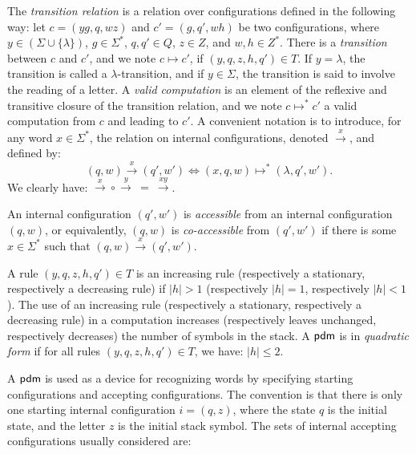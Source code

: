 The \emph{transition relation} is a relation over configurations defined in the following way: let $c = (yg, q, wz)$ and $c' = (g, q', wh)$ be two configurations, where $y \in (\Sigma \cup \{\lambda\})$, $g \in \Sigma^*$, $q, q' \in Q$, $z \in Z$, and $w, h \in Z^*$. There is a \emph{transition} between $c$ and $c'$, and we note $c \mapsto c'$, if $(y, q, z, h, q') \in T$. If $y = \lambda$, the transition is called a $\lambda$-transition, and if $y \in \Sigma$, the transition  is said to involve the reading of a letter. A \emph{valid computation} is an element of the reflexive and transitive closure of the transition relation, and we note $c \mapsto^* c'$ a valid computation from $c$ and leading to $c'$. A convenient notation is to introduce, for any word $x \in \Sigma^*$, the relation on internal configurations, denoted $\xrightarrow{x}$, and defined by:
$$(q, w) \xrightarrow{x} (q', w') \Leftrightarrow (x, q, w) \mapsto^* (\lambda, q', w').$$
We clearly have: $\xrightarrow{x} \circ \xrightarrow{y}\ =\ \xrightarrow{xy}$.

An internal configuration $(q', w')$ is \emph{accessible} from an internal configuration $(q, w)$, or equivalently, $(q, w)$ is \emph{co-accessible} from $(q', w')$ if there is some $x \in \Sigma^*$ such that $(q, w) \xrightarrow{x} (q', w')$.

A rule $(y, q, z, h, q') \in T$ is an increasing rule (respectively a stationary, respectively a decreasing rule) if $|h| > 1$ (respectively $|h| = 1$, respectively $|h| < 1$). The use of an increasing rule (respectively a stationary, respectively a decreasing rule) in a computation increases (respectively leaves unchanged, respectively decreases) the number of symbols in the stack. A \index{$\pdm$}$\pdm$ is in \emph{quadratic form} if for all rules $(y, q, z, h, q') \in T$, we have: $|h| \le 2$.

A \index{$\pdm$}$\pdm$ is used as a device for recognizing words by specifying starting configurations and accepting configurations. The convention is that there is only one starting internal configuration $i = (q, z)$, where the state $q$ is the initial state, and the letter $z$ is the initial stack symbol. The sets of internal accepting configurations usually considered are:


